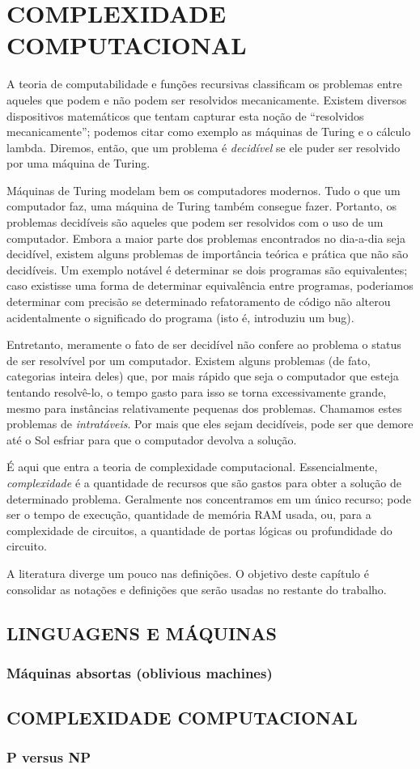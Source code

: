 \chapter{COMPLEXIDADE COMPUTACIONAL}

A teoria de computabilidade e funções recursivas
classificam os problemas entre
aqueles que podem e não podem ser resolvidos mecanicamente.
Existem diversos dispositivos matemáticos
que tentam capturar esta noção de
``resolvidos mecanicamente'';
podemos citar como exemplo
as máquinas de Turing
e o cálculo lambda.
Diremos, então,
que um problema é \emph{decidível}
se ele puder ser resolvido por uma máquina de Turing.

Máquinas de Turing modelam bem os computadores modernos.
Tudo o que um computador faz,
uma máquina de Turing também consegue fazer.
Portanto, os problemas decidíveis são aqueles que
podem ser resolvidos com o uso de um computador.
Embora a maior parte dos problemas
encontrados no dia-a-dia seja decidível,
existem alguns problemas de importância teórica e prática
que não são decidíveis.
Um exemplo notável é determinar se dois programas são equivalentes;
caso existisse uma forma de determinar equivalência entre programas,
poderiamos determinar com precisão
se determinado refatoramento de código
não alterou acidentalmente o significado do programa
(isto é, introduziu um bug).

Entretanto,
meramente o fato de ser decidível
não confere ao problema o status de
ser resolvível por um computador.
Existem alguns problemas
(de fato, categorias inteira deles)
que, por mais rápido que seja o computador
que esteja tentando resolvê-lo,
o tempo gasto para isso
se torna excessivamente grande,
mesmo para instâncias relativamente pequenas dos problemas.
Chamamos estes problemas de \emph{intratáveis}.
Por mais que eles sejam decidíveis,
pode ser que demore até o Sol esfriar
para que o computador devolva a solução.

É aqui que entra a teoria de complexidade computacional.
Essencialmente,
\emph{complexidade}
é a quantidade de recursos que são gastos
para obter a solução de determinado problema.
Geralmente nos concentramos em um único recurso;
pode ser o tempo de execução,
quantidade de memória RAM usada,
ou,
para a complexidade de circuitos,
a quantidade de portas lógicas
ou profundidade do circuito.

A literatura diverge um pouco nas definições.
O objetivo deste capítulo é consolidar
as notações e definições
que serão usadas no restante do trabalho.


\section{LINGUAGENS E MÁQUINAS}

\subsection{Máquinas absortas (oblivious machines)}

\section{COMPLEXIDADE COMPUTACIONAL}

\subsection{P versus NP}
